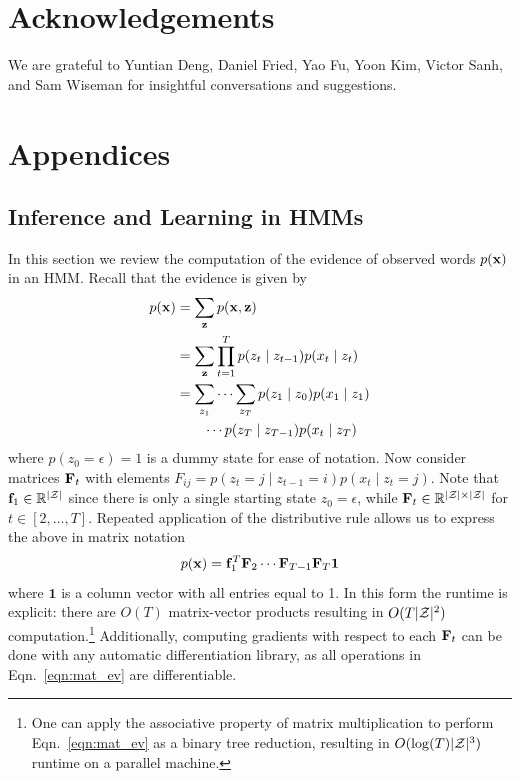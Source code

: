 \documentclass[11pt,a4paper]{article}
\begin{document}
\section*{Acknowledgements}
We are grateful to
Yuntian Deng, Daniel Fried, Yao Fu, Yoon Kim, Victor Sanh, and Sam Wiseman
for insightful conversations and suggestions.




\appendix

\section{Appendices}
\subsection{Inference and Learning in HMMs}
In this section we review the computation of the evidence of observed words $p(\mathbf{x})$ in an HMM.
Recall that the evidence is given by
\begin{equation}
\begin{aligned}
p(\mathbf{x}) &= \sum_{\mathbf{z}} p(\mathbf{x}, \mathbf{z})\\
&= \sum_{\mathbf{z}} \prod_{t=1}^T p(z_t \mid z_{t-1})p(x_t \mid z_t) \\
&= \sum_{z_1} \cdots \sum_{z_T} p(z_1 \mid z_0)p(x_1 \mid z_1)\\
&\qquad \cdots p(z_T \mid z_{T-1})p(x_t \mid z_T)
\end{aligned}
\end{equation}
where $p(z_0=\epsilon)=1$ is a dummy state for ease of notation.
Now consider matrices $\mathbf{F}_t$ with
elements $F_{ij} = p(z_t = j \mid z_{t-1} = i) p(x_t \mid z_t = j)$.
Note that $\mathbf{f}_1 \in \mathbb{R}^{|\mathcal{Z}|}$ since there is only a single starting state $z_0 = \epsilon$,
while $\mathbf{F}_t \in \mathbb{R}^{|\mathcal{Z}|\times|\mathcal{Z}|}$ for $t \in [2, \ldots, T]$.
Repeated application of the distributive rule allows us to express the above in 
matrix notation
\begin{equation}
\label{eqn:mat_ev}
p(\mathbf{x}) = \mathbf{f}_1^T \mathbf{F}_2 \cdots \mathbf{F}_{T-1}\mathbf{F}_{T}\mathbf{1}
\end{equation}
where $\mathbf{1}$ is a column vector with all entries equal to 1.
In this form the runtime is explicit: there are $O(T)$ matrix-vector products
resulting in $O(T |\mathcal{Z}|^2)$ computation.\footnote{
One can apply the associative property of matrix multiplication
to perform Eqn.~\ref{eqn:mat_ev} as a binary tree reduction,
resulting in $O(\log(T)|\mathcal{Z}|^3)$ runtime on a parallel machine.
}
Additionally, computing gradients with respect to each $\mathbf{F}_t$ can be done with
any automatic differentiation library, as all operations in Eqn.~\ref{eqn:mat_ev} are differentiable.
\end{document}
